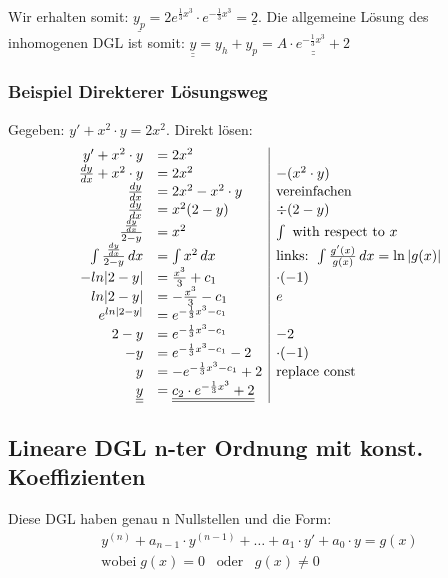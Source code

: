 Wir erhalten somit: $\underline{y_p} = 2 e^{\frac{1}{3}x^3} \cdot e^{-\frac{1}{3}x^3} = \underline{2}$.
Die allgemeine Lösung des inhomogenen DGL ist somit:
$\underline{\underline{y}} = y_h + y_p = \underline{\underline{A \cdot e^{-\frac{1}{3}x^3} + 2}}$


\subsubsection{Beispiel Direkterer Lösungsweg}
Gegeben: $y' + x^2 \cdot y = 2x^2$.
Direkt lösen:
\begin{equation*}
\begin{array}{r l |l}
y' + x^2 \cdot y &= 2x^2\\
\frac{dy}{dx} + x^2 \cdot y &= 2x^2 \quad & -(x^2 \cdot y)\\
\frac{dy}{dx} &= 2x^2 -x^2 \cdot y \quad & \text{vereinfachen}\\
\frac{dy}{dx} &= x^2 ( 2 - y) \quad & \div (2 - y) \\
\frac{\frac{dy}{dx}}{2 - y} &= x^2  & \int \text{ with respect to } x \\
\int \frac{\frac{dy}{dx}}{2 - y}  \, dx &= \int x^2 \, dx & \text{links: } \int \frac{g'(x)}{g(x)} \, dx = \ln|g(x)|\\ 
- ln |2 - y| &= \frac{x^3}{3} + c_1 & \cdot (-1) \\
ln |2 - y| &= - \frac{x^3}{3} - c_1 & e \\
e^{ln |2 - y|} &= e^{-\frac{1}{3}x^3 - c_1 } \\
2 - y &= e^{-\frac{1}{3}x^3 - c_1 }& - 2 \\
- y &= e^{-\frac{1}{3}x^3 - c_1 } - 2 & \cdot (-1)\\
y &= - e^{-\frac{1}{3}x^3 - c_1 } + 2 & \text{replace const} \\
\underline{\underline{y}} &= \underline{\underline{c_2 \cdot e^{-\frac{1}{3}x^3} + 2}}\\
\end{array} 
\end{equation*}


\subsection{Lineare DGL n-ter Ordnung {\footnotesize mit konst. Koeffizienten}}
Diese DGL haben genau n Nullstellen und die Form:
\begin{eqnarray*}
	y^{(n)}+a_{n-1} \cdot y^{(n-1)}+\ldots+a_1 \cdot y' +a_0 \cdot y=g(x)\\
	\text{wobei} \; g(x) = 0 \hspace{10pt} \text{oder} \hspace{10pt} g(x) \neq 0
\end{eqnarray*}

